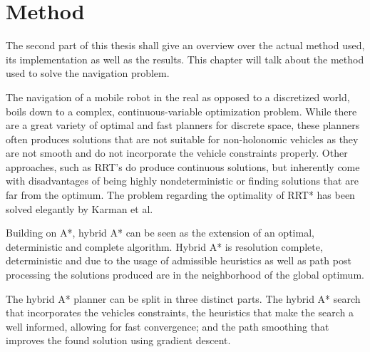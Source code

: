 \chapter{Method}
The second part of this thesis shall give an overview over the actual method used, its implementation as well as the results. This chapter will talk about the method used to solve the navigation problem.

The navigation of a mobile robot in the real as opposed to a discretized world, boils down to a complex, continuous-variable optimization problem. While there are a great variety of optimal and fast planners for discrete space, these planners often produces solutions that are not suitable for non-holonomic vehicles as they are not smooth and do not incorporate the vehicle constraints properly.
Other approaches, such as RRT's do produce continuous solutions, but inherently come with disadvantages of being highly nondeterministic or finding solutions that are far from the optimum. The problem regarding the optimality of RRT* has been solved elegantly by Karman et al\cite{Karaman.2011}.

Building on A*, hybrid A* can be seen as the extension of an optimal, deterministic and complete algorithm. Hybrid A* is resolution complete, deterministic and due to the usage of admissible heuristics as well as path post processing the solutions produced are in the neighborhood of the global optimum.

The hybrid A* planner can be split in three distinct parts. The hybrid A* search that incorporates the vehicles constraints, the heuristics that make the search a well informed, allowing for fast convergence; and the path smoothing that improves the found solution using gradient descent.



